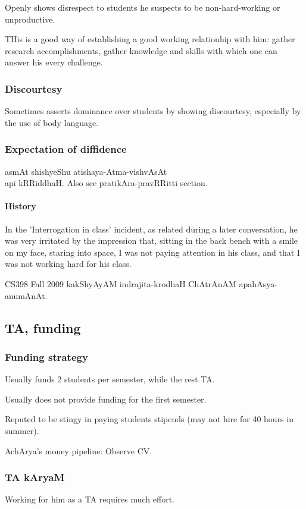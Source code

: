\documentclass[oneside, article]{memoir}
\begin{document}
Openly shows disrespect to students he suspects to be non-hard-working or unproductive.

THis is a good way of establishing a good working relationhip with him: gather research accomplishments, gather knowledge and skills with which one can answer his every challenge.

\subsubsection{Discourtesy}
Sometimes asserts dominance over students by showing discourtesy, especially by the use of body language.



\subsubsection{Expectation of diffidence}
asmAt shishyeShu atishaya-Atma-vishvAsAt \\
api kRRiddhaH. Also see pratikAra-pravRRitti section.

\paragraph*{History}
In the 'Interrogation in class' incident, as related during a later conversation, he was very irritated by the impression that, sitting in the back bench with a smile on my face, staring into space, I was not paying attention in his class, and that I was not working hard for his class.

CS398 Fall 2009 kakShyAyAM indrajita-krodhaH ChAtrAnAM apahAsya-anumAnAt.


\subsection{TA, funding}
\subsubsection{Funding strategy}
Usually funds 2 students per semester, while the rest TA.

Usually does not provide funding for the first semester.

Reputed to be stingy in paying students stipends (may not hire for 40 hours in summer).

AchArya's money pipeline: Observe CV.

\subsubsection{TA kAryaM}
Working for him as a TA requires much effort.
\end{document}
